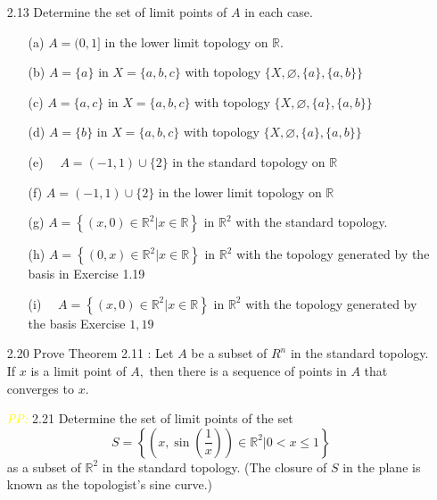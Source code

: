 \documentclass[12pt]{article}
\newcommand{\pp}{\textit{\textcolor{yellow}{PP: }}}%
\begin{document}
\begin{enumerate}
	\item[2.13] Determine the set of limit points of $ A $ in each case.
		\begin{enumerate}
			\item[(a)] $A=(0,1]$ in the lower limit topology on $\mathbb{R}$.
			\item[(b)] $A=\{a\}$ in $X=\{a, b, c\}$ with topology $\{X, \varnothing,\{a\},\{a, b\}\}$
			\item[(c)] $A=\{a, c\}$ in $X=\{a, b, c\}$ with topology $\{X, \varnothing,\{a\},\{a, b\}\}$
			\item[(d)] $A=\{b\}$ in $X=\{a, b, c\}$ with topology $\{X, \varnothing,\{a\},\{a, b\}\}$
			\item[(e)] $\quad A=(-1,1) \cup\{2\}$ in the standard topology on $\mathbb{R}$
			\item[(f)] $A=(-1,1) \cup\{2\}$ in the lower limit topology on $\mathbb{R}$
			\item[(g)] $A=\left\{(x, 0) \in \mathbb{R}^{2} | x \in \mathbb{R}\right\}$ in $\mathbb{R}^{2}$ with the standard topology.
			\item[(h)] $A=\left\{(0, x) \in \mathbb{R}^{2} | x \in \mathbb{R}\right\}$ in $\mathbb{R}^{2}$ with the topology generated by the basis in Exercise 1.19
			\item[(i)] $\quad A=\left\{(x, 0) \in \mathbb{R}^{2} | x \in \mathbb{R}\right\}$ in $\mathbb{R}^{2}$ with the topology generated by the basis Exercise $1,19$
		\end{enumerate}
	\item[2.20] Prove Theorem 2.11 : Let $A$ be a subset of $R^{n}$ in the standard topology. If $x$ is a limit point of $A,$ then there is a sequence of points in $A$ that converges to $x$.
	
	\item[\pp2.21] Determine the set of limit points of the set
	$$
	S=\left\{\left(x, \sin \left(\frac{1}{x}\right)\right) \in \mathbb{R}^{2} | 0<x \leq 1\right\}
	$$
	as a subset of $\mathbb{R}^{2}$ in the standard topology. (The closure of $S$ in the plane is known as the topologist's sine curve.)
	
\end{enumerate}
\end{document}
